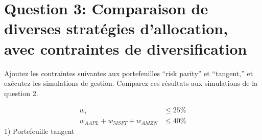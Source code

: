 \documentclass[
]{article}
\begin{document}
\hypertarget{question-3-comparaison-de-diverses-stratuxe9gies-dallocation-avec-contraintes-de-diversification}{%
\section{Question 3: Comparaison de diverses stratégies d'allocation,
avec contraintes de
diversification}\label{question-3-comparaison-de-diverses-stratuxe9gies-dallocation-avec-contraintes-de-diversification}}

Ajoutez les contraintes suivantes aux portefeuilles ``risk parity'' et
``tangent,'' et exécutez les simulations de gestion. Comparez ces
résultats aux simulations de la question 2.

\[
\begin{aligned}
w_i & \leq 25\% \\
w_{AAPL} + w_{MSFT} + w_{AMZN} & \leq 40\%
\end{aligned}
\] 1) Portefeuille tangent
\end{document}
